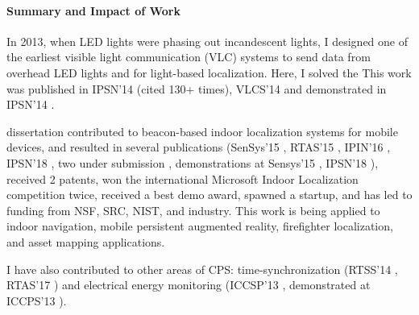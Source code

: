 \documentclass[10pt]{article}
\begin{document}
\paragraph{Summary and Impact of Work}
In 2013, when LED lights were phasing out
incandescent lights, I designed one of the earliest visible light
communication (VLC) systems to send data from overhead LED lights and
for light-based localization. Here, I solved the This work was published in IPSN'14\cite{rajagopal2014visual}
(cited 130+ times), VLCS'14 \cite{rajagopal2014hybrid} and demonstrated in IPSN'14 \cite{rajagopal2014demonstration}.  


dissertation contributed to beacon-based indoor localization systems
for mobile devices, and resulted in several publications (SenSys'15 \cite{lazik2015alps},
RTAS'15 \cite{rtas-alps-platform}, IPIN'16 \cite{rajagopal2016beacon}, IPSN'18 \cite{rajagopal2018enhancing}, two under submission \cite{mobileAR, beaconplacementtheory}, demonstrations at
Sensys'15 \cite{lazik2015alpsdemo}, IPSN'18 \cite{rajagopal2018welcome}), received 2 patents, won the international
Microsoft Indoor Localization competition twice, received a best demo
award, spawned a startup, and has led to funding from NSF, SRC, NIST, and
industry. This work is being applied to indoor navigation, mobile
persistent augmented reality, firefighter localization, and asset
mapping applications.  

I have also contributed to other areas of CPS:
time-synchronization (RTSS'14 \cite{buevich2013hardware}, RTAS'17 \cite{dongare2017pulsar}) and electrical energy
monitoring (ICCSP'13 \cite{rajagopal2013magnetic}, demonstrated at ICCPS'13 \cite{rajagopal2013demo}).




\end{document}

